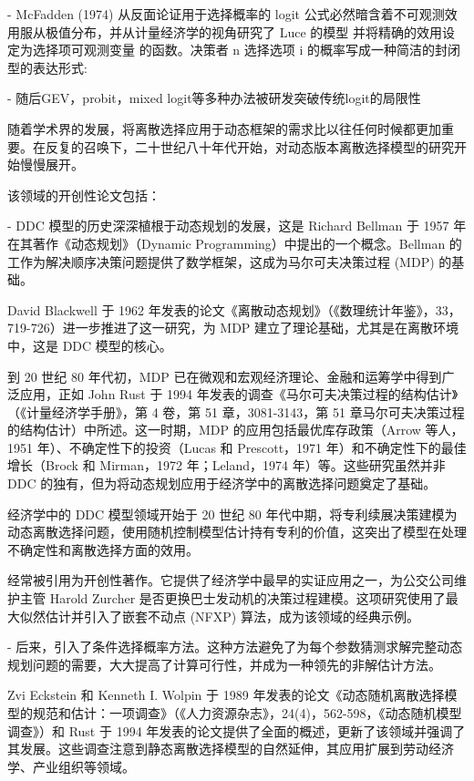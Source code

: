 \documentclass[a4paper,12pt,oneside]{book} %
\begin{document}
- McFadden (1974) 从反面论证用于选择概率的 logit 公式必然暗含着不可观测效用服从极值分布，并从计量经济学的视角研究了 Luce 的模型 并将精确的效用设定为选择项可观测变量 的函数。决策者 n 选择选项 i 的概率写成一种简洁的封闭型的表达形式:

- 随后GEV，probit，mixed logit等多种办法被研发突破传统logit的局限性





随着学术界的发展，将离散选择应用于动态框架的需求比以往任何时候都更加重要。在反复的召唤下，二十世纪八十年代开始，对动态版本离散选择模型的研究开始慢慢展开。

该领域的开创性论文包括：

- DDC 模型的历史深深植根于动态规划的发展，这是 Richard Bellman 于 1957 年在其著作《动态规划》（Dynamic Programming）中提出的一个概念。Bellman 的工作为解决顺序决策问题提供了数学框架，这成为马尔可夫决策过程 (MDP) 的基础。 

David Blackwell 于 1962 年发表的论文《离散动态规划》（《数理统计年鉴》，33，719-726）进一步推进了这一研究，为 MDP 建立了理论基础，尤其是在离散环境中，这是 DDC 模型的核心。

到 20 世纪 80 年代初，MDP 已在微观和宏观经济理论、金融和运筹学中得到广泛应用，正如 John Rust 于 1994 年发表的调查《马尔可夫决策过程的结构估计》（《计量经济学手册》，第 4 卷，第 51 章，3081-3143，第 51 章马尔可夫决策过程的结构估计）中所述。这一时期，MDP 的应用包括最优库存政策（Arrow 等人，1951 年）、不确定性下的投资（Lucas 和 Prescott，1971 年）和不确定性下的最佳增长（Brock 和 Mirman，1972 年；Leland，1974 年）等。这些研究虽然并非 DDC 的独有，但为将动态规划应用于经济学中的离散选择问题奠定了基础。

经济学中的 DDC 模型领域开始于 20 世纪 80 年代中期，\cite{pakesPatentsOptionsEstimates1986}将专利续展决策建模为动态离散选择问题，使用随机控制模型估计持有专利的价值，这突出了模型在处理不确定性和离散选择方面的效用。

\cite{rustOptimalReplacementGMC1987}经常被引用为开创性著作。它提供了经济学中最早的实证应用之一，为公交公司维护主管 Harold Zurcher 是否更换巴士发动机的决策过程建模。这项研究使用了最大似然估计并引入了嵌套不动点 (NFXP) 算法，成为该领域的经典示例。

- 后来，\cite{hotzConditionalChoiceProbabilities1993}引入了条件选择概率方法。这种方法避免了为每个参数猜测求解完整动态规划问题的需要，大大提高了计算可行性，并成为一种领先的非解估计方法。

Zvi Eckstein 和 Kenneth I. Wolpin 于 1989 年发表的论文《动态随机离散选择模型的规范和估计：一项调查》（《人力资源杂志》，24(4)，562-598，《动态随机模型调查》）和 Rust 于 1994 年发表的论文提供了全面的概述，更新了该领域并强调了其发展。这些调查注意到静态离散选择模型的自然延伸，其应用扩展到劳动经济学、产业组织等领域。
\end{document}

